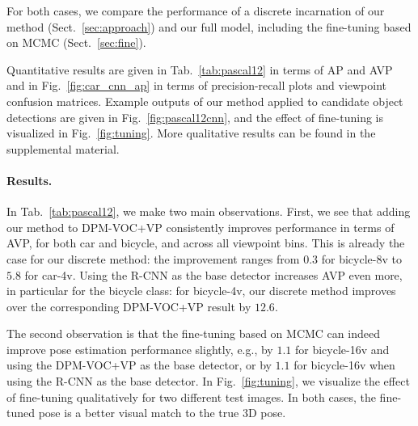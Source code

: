 For both cases, we compare the performance of a discrete incarnation
of our method (Sect.~\ref{sec:approach}) and our full model, including the
fine-tuning based on MCMC (Sect.~\ref{sec:fine}).

Quantitative results are given in Tab.~\ref{tab:pascal12} in terms of
AP and AVP and in Fig.~\ref{fig:car_cnn_ap} in terms of
precision-recall plots and viewpoint confusion matrices. Example
outputs of our method applied to candidate object detections are given
in Fig.~\ref{fig:pascal12cnn}, and the effect of fine-tuning is
visualized in Fig.~\ref{fig:tuning}. More qualitative results can be found in the
supplemental material.
\paragraph{Results.}
%
In Tab.~\ref{tab:pascal12}, we make two main observations. First, we
see that adding our method to DPM-VOC+VP consistently improves
performance in terms of AVP, for both car and bicycle, and across all
viewpoint bins. This is already the case for our discrete method: the
improvement ranges from $0.3$ for bicycle-8v to $5.8$ for car-4v. 
%
Using the R-CNN as the base detector increases AVP even more, in
particular for the bicycle class: for bicycle-4v, our discrete method
improves over the corresponding DPM-VOC+VP result by $12.6$.

The second observation is that the fine-tuning based on MCMC can
indeed improve pose estimation performance slightly, e.g., by $1.1$
for bicycle-16v and using the DPM-VOC+VP as the base detector, or by
$1.1$ for bicycle-16v when using the R-CNN as the base detector.
%
In Fig.~\ref{fig:tuning}, we visualize the effect of fine-tuning
qualitatively for two different test images. In both cases, the
fine-tuned pose is a better visual match to the true 3D pose.

